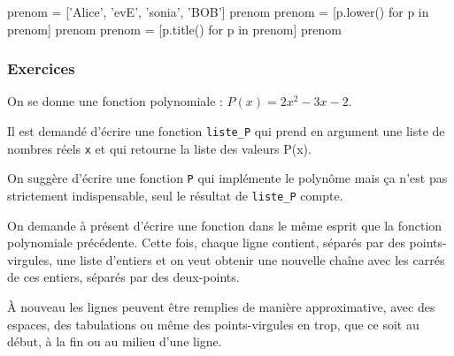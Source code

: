 \begin{idleconsole}
\begin{pyconsole}
prenom = ['Alice', 'evE', 'sonia', 'BOB']
prenom
prenom = [p.lower() for p in prenom]
prenom
prenom = [p.title() for p in prenom]
prenom
\end{pyconsole}
\end{idleconsole}

\subsubsection[Exercices]{Exercices}
\label{subsub:XI.4.1.2}

\begin{exercise}[title={Fonction polynomiale}, level=basic]
On se donne une fonction polynomiale :
$P(x) = 2x^2 - 3x - 2$.

Il est demandé d'écrire une fonction \texttt{liste\_P} qui prend en argument une liste de nombres réels \texttt{x} et qui retourne la liste des valeurs P(x).

On suggère d'écrire une fonction \texttt{P} qui implémente le polynôme mais ça n'est pas strictement indispensable, seul le résultat de \texttt{liste\_P} compte.
\end{exercise}

\begin{exercise}[title={Mise au carré}, level=intermediate]
On demande à présent d'écrire une fonction dans le même esprit que la fonction polynomiale précédente. Cette fois, chaque ligne contient, séparés par des points-virgules, une liste d'entiers et on veut obtenir une nouvelle chaîne avec les carrés de ces entiers, séparés par des deux-points.

À nouveau les lignes peuvent être remplies de manière approximative, avec des espaces, des tabulations ou même des points-virgules en trop, que ce soit au début, à la fin ou au milieu d'une ligne.
\end{exercise}


